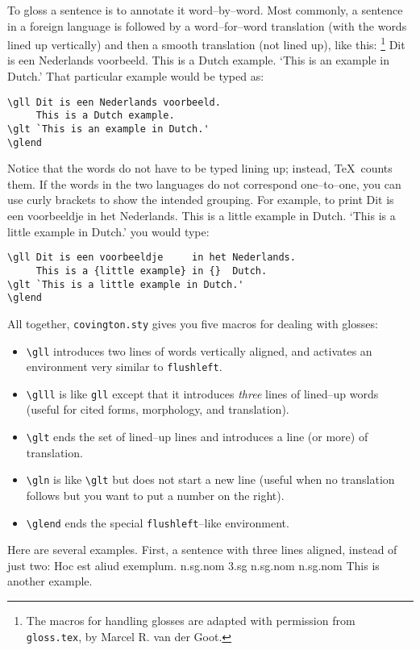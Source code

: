 \documentclass{article}
\begin{document}
To gloss a sentence is to annotate it word--by--word.  Most commonly, a 
sentence in a foreign language is followed by a word--for--word 
translation (with the words lined up vertically) and then a smooth 
translation (not lined up), like this:%
\footnote{The macros for handling glosses are adapted with permission 
from \texttt{gloss.tex}, by Marcel R. van der Goot.}
\gll Dit is een Nederlands voorbeeld. 
     This is a Dutch example. 
\glt `This is an example in Dutch.'
\glend
That particular example would be typed as:
\begin{verbatim}
\gll Dit is een Nederlands voorbeeld. 
     This is a Dutch example. 
\glt `This is an example in Dutch.'
\glend
\end{verbatim}
Notice that the words do not have to be typed lining up; instead, \TeX\ 
counts them.  If the words in the two languages do not correspond 
one--to--one, you can use curly brackets to show the intended grouping.
For example, to print
\gll Dit is een voorbeeldje     in het Nederlands.
     This is a {little example} in {}  Dutch.
\glt `This is a little example in Dutch.'
\glend
you would type:
\begin{verbatim}
\gll Dit is een voorbeeldje     in het Nederlands.
     This is a {little example} in {}  Dutch.
\glt `This is a little example in Dutch.'
\glend
\end{verbatim}
All together, \texttt{covington.sty} gives you five macros for dealing with
glosses:
\begin{itemize}
\item \verb"\gll" introduces two lines of words vertically aligned, and 
activates an environment very similar to \texttt{flushleft}.
\item \verb"\glll" is like \verb"gll" except that it introduces
\emph{three} lines of lined--up words (useful for cited forms, morphology,
and translation).
\item \verb"\glt" ends the set of lined--up lines and introduces a line 
(or more) of translation.
\item \verb"\gln" is like \verb"\glt" but does not start a new line 
(useful when no translation follows but you want to put a number on the 
right).
\item \verb"\glend" ends the special \texttt{flushleft}--like environment.
\end{itemize}
Here are several examples.  First, a sentence with three lines aligned, 
instead of just two:
\glll  Hoc est aliud exemplum.
       n.sg.nom 3.sg n.sg.nom n.sg.nom
       This is another example.
\end{document}
